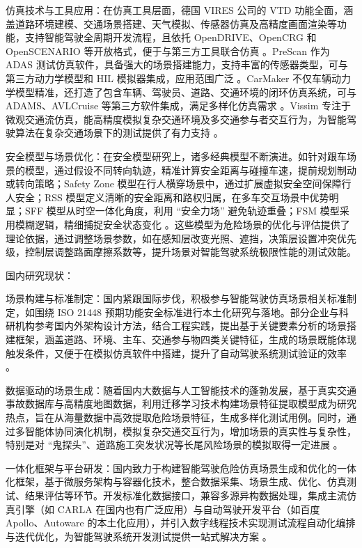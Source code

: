 仿真技术与工具应用：在仿真工具层面，德国 VIRES 公司的 VTD 功能全面，涵盖道路环境建模、交通场景搭建、天气模拟、传感器仿真及高精度画面渲染等功能，支持智能驾驶全周期开发流程，且依托 OpenDRIVE、OpenCRG 和 OpenSCENARIO 等开放格式，便于与第三方工具联合仿真 。PreScan 作为 ADAS 测试仿真软件，具备强大的场景搭建能力，支持丰富的传感器类型，可与第三方动力学模型和 HIL 模拟器集成，应用范围广泛 。CarMaker 不仅车辆动力学模型精准，还打造了包含车辆、驾驶员、道路、交通环境的闭环仿真系统，可与 ADAMS、AVLCruise 等第三方软件集成，满足多样化仿真需求 。Vissim 专注于微观交通流仿真，能高精度模拟复杂交通环境及多交通参与者交互行为，为智能驾驶算法在复杂交通场景下的测试提供了有力支持 。

安全模型与场景优化：在安全模型研究上，诸多经典模型不断演进。如针对跟车场景的模型，通过假设不同转向轨迹，精准计算安全距离与碰撞车速，提前规划制动或转向策略；Safety Zone 模型在行人横穿场景中，通过扩展虚拟安全空间保障行人安全；RSS 模型定义清晰的安全距离和路权归属，在多车交互场景中优势明显；SFF 模型从时空一体化角度，利用 “安全力场” 避免轨迹重叠；FSM 模型采用模糊逻辑，精细捕捉安全状态变化 。这些模型为危险场景的优化与评估提供了理论依据，通过调整场景参数，如在感知层改变光照、遮挡，决策层设置冲突优先级，控制层调整路面摩擦系数等，提升场景对智能驾驶系统极限性能的测试效能。

国内研究现状：

场景构建与标准制定：国内紧跟国际步伐，积极参与智能驾驶仿真场景相关标准制定，如围绕 ISO 21448 预期功能安全标准进行本土化研究与落地。部分企业与科研机构参考国内外架构设计方法，结合工程实践，提出基于关键要素分析的场景搭建框架，涵盖道路、环境、主车、交通参与物四类关键特征，生成的场景既能体现触发条件，又便于在模拟仿真软件中搭建，提升了自动驾驶系统测试验证的效率 。

数据驱动的场景生成：随着国内大数据与人工智能技术的蓬勃发展，基于真实交通事故数据库与高精度地图数据，利用迁移学习技术构建场景特征提取模型成为研究热点，旨在从海量数据中高效提取危险场景特征，生成多样化测试用例。同时，通过多智能体协同演化机制，模拟复杂交通交互行为，增加场景的真实性与复杂性，特别是对 “鬼探头”、道路施工突发状况等长尾风险场景的模拟取得一定进展 。

一体化框架与平台研发：国内致力于构建智能驾驶危险仿真场景生成和优化的一体化框架，基于微服务架构与容器化技术，整合数据采集、场景生成、优化、仿真测试、结果评估等环节。开发标准化数据接口，兼容多源异构数据处理，集成主流仿真引擎（如 CARLA 在国内也有广泛应用）与自动驾驶开发平台（如百度 Apollo、Autoware 的本土化应用），并引入数字线程技术实现测试流程自动化编排与迭代优化，为智能驾驶系统开发测试提供一站式解决方案 。

